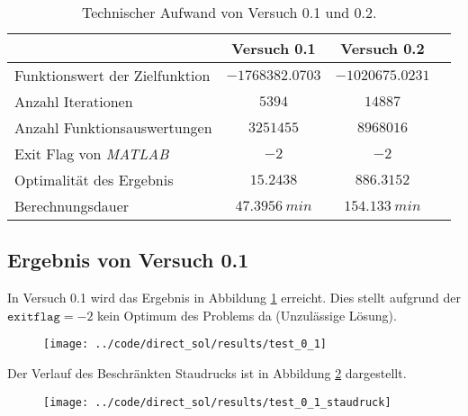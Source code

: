 \begin{table}[H]
    \centering
    \caption{Technischer Aufwand von Versuch 0.1 und 0.2.}\label{tab:Versuch0_TA}
    \begin{tabularx}{.9\textwidth}{Zccc}
        \toprule
         & \textbf{Versuch 0.1} & \textbf{Versuch 0.2} \\
        \midrule
        Funktionswert der Zielfunktion & $-1768382.0703$ & $-1020675.0231$ \\
        Anzahl Iterationen & $5394$ & $14887$ \\
        Anzahl Funktionsauswertungen & $3251455$ & $8968016$ \\
        Exit Flag von \textit{MATLAB} & $-2$ & $-2$ \\
        Optimalität des Ergebnis & $15.2438$ & $886.3152$ \\
        Berechnungsdauer & $47.3956 \ min$ & $154.133 \ min$ \\
        \bottomrule
    \end{tabularx}
\end{table}



\subsection{Ergebnis von Versuch 0.1}\label{kap:Versuch01}
In Versuch 0.1 wird das Ergebnis in Abbildung \ref{img:test_0_1} erreicht. Dies stellt aufgrund der $\texttt{exitflag} = -2$ kein Optimum des Problems da (Unzulässige Lösung). 
\begin{figure}[H]
\begin{center}
\texttt{[image: ../code/direct\_sol/results/test\_0\_1]}
 \label{img:test_0_1}
\end{center}
\end{figure}
Der Verlauf des Beschränkten Staudrucks ist in Abbildung \ref{img:test_0_1_staudruck} dargestellt.
\begin{figure}[H]
\begin{center}
\texttt{[image: ../code/direct\_sol/results/test\_0\_1\_staudruck]}
\label{img:test_0_1_staudruck}
\end{center}
\end{figure}





